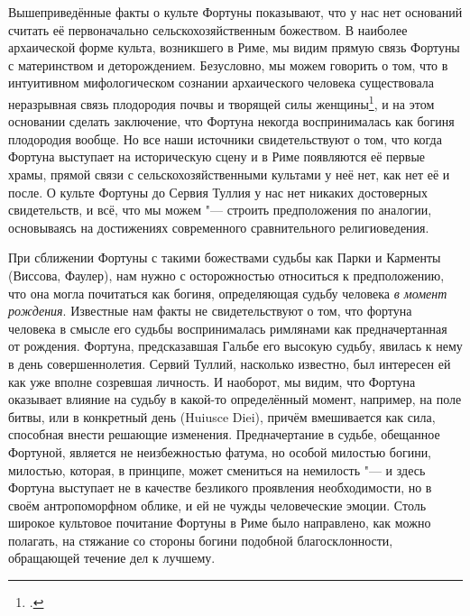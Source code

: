 
Вышеприведённые факты о культе Фортуны показывают, что у нас нет оснований считать её первоначально сельскохозяйственным божеством. В наиболее архаической форме культа, возникшего в Риме, мы видим прямую связь Фортуны с материнством и деторождением. Безусловно, мы можем говорить о том, что в интуитивном мифологическом сознании архаического человека существовала неразрывная связь плодородия почвы и творящей силы женщины\footcite[С. 307]{Eliade1999}, и на этом основании сделать заключение, что Фортуна некогда воспринималась как богиня плодородия вообще. Но все наши источники свидетельствуют о том, что когда Фортуна выступает на историческую сцену и в Риме появляются её первые храмы, прямой связи с сельскохозяйственными культами у неё нет, как нет её и после. О культе Фортуны до Сервия Туллия у нас нет никаких достоверных свидетельств, и всё, что мы можем "--- строить предположения по аналогии, основываясь на достижениях современного сравнительного религиоведения.

При сближении Фортуны с такими божествами судьбы как Парки и Карменты (Виссова, Фаулер), нам нужно с осторожностью относиться к предположению, что она могла почитаться как богиня, определяющая судьбу человека \textit{в момент рождения}. Известные нам факты не свидетельствуют о том, что фортуна человека в смысле его судьбы воспринималась римлянами как предначертанная от рождения. Фортуна, предсказавшая Гальбе его высокую судьбу, явилась к нему в день совершеннолетия. Сервий Туллий, насколько известно, был интересен ей как уже вполне созревшая личность. И наоборот, мы видим, что Фортуна оказывает влияние на судьбу в какой-то определённый момент, например, на поле битвы, или в конкретный день (Huiusce Diei), причём вмешивается как сила, способная внести решающие изменения. Предначертание в судьбе, обещанное Фортуной, является не неизбежностью фатума, но особой милостью богини, милостью, которая, в принципе, может смениться на немилость "--- и здесь Фортуна выступает не в качестве безликого проявления необходимости, но в своём антропоморфном облике, и ей не чужды человеческие эмоции. Столь широкое культовое почитание Фортуны в Риме было направлено, как можно полагать, на стяжание со стороны богини подобной благосклонности, обращающей течение дел к лучшему.




